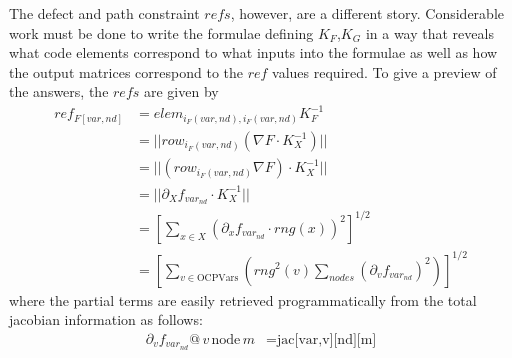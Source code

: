 \documentclass{article}
\begin{document}
The defect and path constraint $refs$, however, are a different story. Considerable work must be done to write the formulae defining $K_F$,$K_G$ in a way that reveals what code elements correspond to what inputs into the formulae as well as how the output matrices correspond to the $ref$ values required. To give a preview of the answers, the $refs$ are given by
\begin{align*}
	ref_{F[var,nd]} &= elem_{i_F(var,nd),i_F(var,nd)}K^{-1}_F \\
	&= ||row_{i_F(var,nd)}(\nabla F \cdot K^{-1}_X)|| \\
	&= ||(row_{i_F(var,nd)}\nabla F) \cdot K^{-1}_X|| \\
	&= ||\partial_X f_{var_{nd}} \cdot K^{-1}_X|| \\
	&= [\sum_{x \in X}(\partial_x f_{var_{nd}} \cdot rng(x))^2]^{1/2} \\
	&= [\sum_{v \in \text{OCPVars}}(rng^2(v)\sum_{nodes}(\partial_v f_{var_{nd}})^2)]^{1/2}
\end{align*}
where the partial terms are easily retrieved programmatically from the total jacobian information as follows:
\begin{align*}
	\partial_v f_{var_{nd}} @\,v\,\text{node}\,m &= \text{jac[var,v][nd][m]}
\end{align*}
\end{document}
